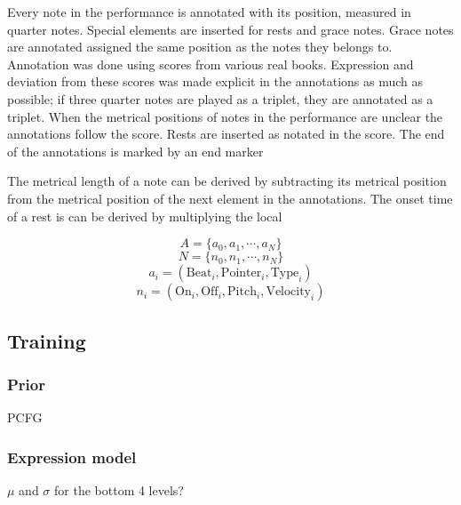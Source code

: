 Every note in the performance is annotated with its position, measured in quarter notes. Special elements are inserted for rests and grace notes. Grace notes are annotated assigned the same position as the notes they belongs to. Annotation was done using scores from various real books. Expression and deviation from these scores was made explicit in the annotations as much as possible; if three quarter notes are played as a triplet, they are annotated as a triplet. When the metrical positions of notes in the performance are unclear the annotations follow the score. Rests are inserted as notated in the score. The end of the annotations is marked by an end marker

The metrical length of a note can be derived by subtracting its metrical position from the metrical position of the next element in the annotations. The onset time of a rest is can be derived by multiplying the local 

\[A = \{a_0, a_1, \cdots, a_N\}\]
\[N = \{n_0, n_1, \cdots, n_N\}\]
\[a_i = (\mathrm{Beat}_i, \mathrm{Pointer}_i, \mathrm{Type}_i)\]
\[n_i = (\mathrm{On}_i, \mathrm{Off}_i, \mathrm{Pitch}_i, \mathrm{Velocity}_i)\]

\subsection{Training}

\subsubsection{Prior}

PCFG

\subsubsection{Expression model}

$\mu$ and $\sigma$ for the bottom 4 levels?